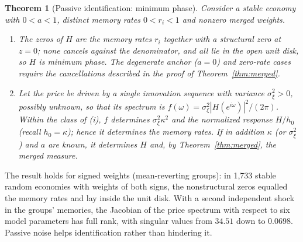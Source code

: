 \documentclass[12pt]{article}
\newtheorem{theorem}{Theorem}[section]
\theoremstyle{definition}
\theoremstyle{remark}
\begin{document}
\begin{theorem}[Passive identification: minimum phase]\label{thm:minphase}
Consider a stable economy with $0<a<1$, distinct memory rates $0<r_i<1$ and nonzero merged weights.
\begin{enumerate}[label=(\roman*)]
\item The zeros of $H$ are the memory rates $r_i$ together with a structural zero at $z=0$; none cancels against the denominator, and all lie in the open unit disk, so $H$ is minimum phase. The degenerate anchor ($a=0$) and zero-rate cases require the cancellations described in the proof of Theorem~\ref{thm:merged}.
\item Let the price be driven by a single innovation sequence with variance $\sigma_\xi^2>0$, possibly unknown, so that its spectrum is $f(\omega)=\sigma_\xi^2|H(e^{i\omega})|^2/(2\pi)$. Within the class of (i), $f$ determines $\sigma_\xi^2\kappa^2$ and the normalized response $H/h_0$ (recall $h_0=\kappa$); hence it determines the memory rates. If in addition $\kappa$ (or $\sigma_\xi^2$) and $a$ are known, it determines $H$ and, by Theorem~\ref{thm:merged}, the merged measure.
\end{enumerate}
\end{theorem}


The result holds for signed weights (mean-reverting groups): in 1,733 stable random economies with weights of both signs, the nonstructural zeros equalled the memory rates and lay inside the unit disk. With a second independent shock in the groups' memories, the Jacobian of the price spectrum with respect to six model parameters has full rank, with singular values from $34.51$ down to $0.0698$. Passive noise helps identification rather than hindering it.
\end{document}
